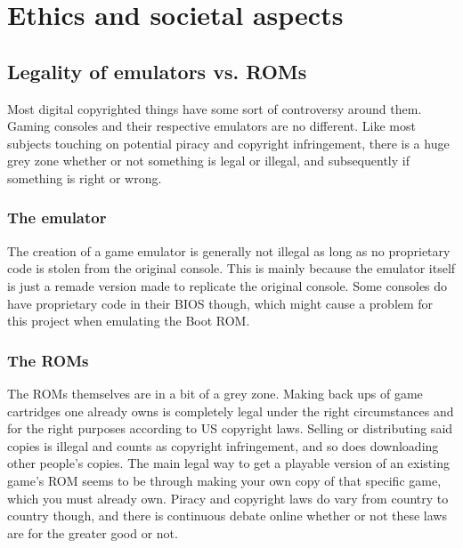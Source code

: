 
\chapter{Ethics and societal aspects}
\section{Legality of emulators vs. ROMs}
Most digital copyrighted things have some sort of controversy around them. Gaming consoles and their respective emulators are no different. Like most subjects touching on potential piracy and copyright infringement, there is a huge grey zone whether or not something is legal or illegal, and subsequently if something is right or wrong. 

\subsection{The emulator}
The creation of a game emulator is generally not illegal as long as no proprietary code is stolen from the original console\cite{emulatorLegal}. This is mainly because the emulator itself is just a remade version made to replicate the original console. Some consoles do have proprietary code in their BIOS though, which might cause a problem for this project when emulating the Boot ROM. 

\subsection{The ROMs}
The ROMs themselves are in a bit of a grey zone\cite{romLegal}. Making back ups of game cartridges one already owns is completely legal under the right circumstances and for the right purposes according to US copyright laws\cite{section117}. Selling or distributing said copies is illegal and counts as copyright infringement, and so does downloading other people's copies. The main legal way to get a playable version of an existing game's ROM seems to be through making your own copy of that specific game, which you must already own. Piracy and copyright laws do vary from country to country though, and there is continuous debate online whether or not these laws are for the greater good or not\cite{emulatorPodcast}.

